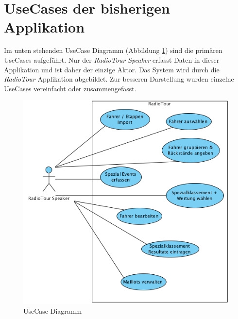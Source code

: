 \section{UseCases der bisherigen Applikation}
\label{ref:usecases}
Im unten stehenden UseCase Diagramm (Abbildung \ref{fig:usecasediagram}) sind die primären UseCases aufgeführt. Nur der \textit{RadioTour Speaker} erfasst Daten in dieser Applikation und ist daher der einzige Aktor. Das System wird durch die \textit{RadioTour} Applikation abgebildet. Zur besseren Darstellung wurden einzelne UseCases vereinfacht oder zusammengefasst.
\begin{figure}[h1]
  \caption{UseCase Diagramm}
  \label{fig:usecasediagram}
  \begin{center}
    \includegraphics[scale=0.6]{05bericht/images/usecasediagram.png}
  \end{center}
\end{figure}


